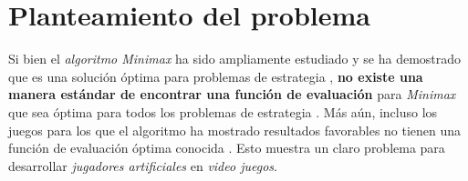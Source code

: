 \section{Planteamiento del problema}

  Si bien el \textit{algoritmo Minimax} ha sido ampliamente estudiado y se ha demostrado que es una
  solución óptima para problemas de estrategia 
  \cite{v.neumannZurTheorieGesellschaftsspiele1928,fanMinimaxTheorems1953}, \textbf{no existe una 
  manera estándar de encontrar una función de evaluación} para \textit{Minimax} que sea óptima para 
  todos los problemas de estrategia \cite{dyerCS540Lecture}.
  Más aún, incluso los juegos para los que el algoritmo ha mostrado resultados favorables no tienen
  una función de evaluación óptima conocida \cite{shannonProgrammingComputerPlaying1988}.
  Esto muestra un claro problema para desarrollar \textit{jugadores artificiales} en \textit{video 
  juegos}.